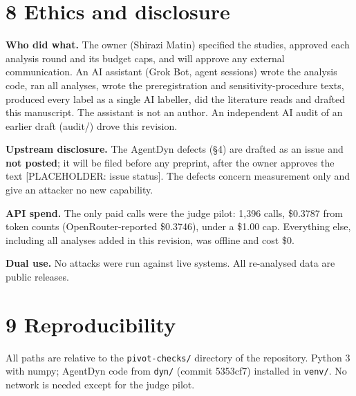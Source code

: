 \documentclass[11pt]{article}
\begin{document}
\section{8 Ethics and disclosure}\label{ethics-and-disclosure}

\textbf{Who did what.} The owner (Shirazi Matin) specified the studies, approved each analysis round and its budget caps, and will approve any external communication. An AI assistant (Grok Bot, agent sessions) wrote the analysis code, ran all analyses, wrote the preregistration and sensitivity-procedure texts, produced every label as a single AI labeller, did the literature reads and drafted this manuscript. The assistant is not an author. An independent AI audit of an earlier draft (audit/) drove this revision.

\textbf{Upstream disclosure.} The AgentDyn defects (§4) are drafted as an issue and \textbf{not posted}; it will be filed before any preprint, after the owner approves the text {[}PLACEHOLDER: issue status{]}. The defects concern measurement only and give an attacker no new capability.

\textbf{API spend.} The only paid calls were the judge pilot: 1,396 calls, \$0.3787 from token counts (OpenRouter-reported \$0.3746), under a \$1.00 cap. Everything else, including all analyses added in this revision, was offline and cost \$0.

\textbf{Dual use.} No attacks were run against live systems. All re-analysed data are public releases.

\section{9 Reproducibility}\label{reproducibility}

All paths are relative to the \texttt{pivot-checks/\allowbreak{}} directory of the repository. Python 3 with numpy; AgentDyn code from \texttt{dyn/\allowbreak{}} (commit 5353cf7) installed in \texttt{venv/\allowbreak{}}. No network is needed except for the judge pilot.
\end{document}
